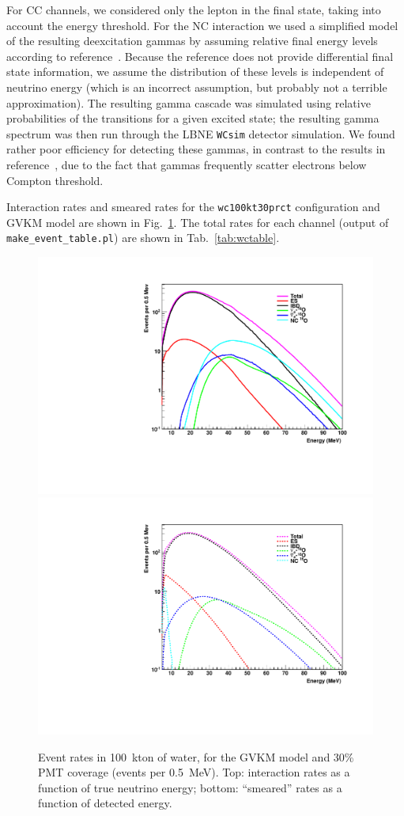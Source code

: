 \documentclass[12pt]{article}
\begin{document}
For CC channels, we considered only the lepton in the final state,
taking into account the energy threshold.  For the NC interaction we
used a simplified model of the resulting deexcitation gammas by
assuming relative final energy levels according to
reference~\cite{Kolbe:2002gk}.  Because the reference does not provide
differential final state information, we assume the distribution of
these levels is independent of neutrino energy (which is an incorrect
assumption, but probably not a terrible approximation).  The resulting
gamma cascade was simulated using relative probabilities of the
transitions for a given excited state; the resulting gamma spectrum
was then run through the LBNE \texttt{WCsim} detector simulation.  We found rather poor
efficiency for detecting these gammas, in contrast to the results in
reference~\cite{Langanke:1995he}, due to the fact that gammas
frequently scatter electrons below Compton threshold.

Interaction rates and smeared rates for the \texttt{wc100kt30prct} configuration and GVKM model are shown in
Fig.~\ref{fig:wcrates}.  The total rates for each channel (output of \texttt{make\_event\_table.pl}) are shown in Tab.~\ref{tab:wctable}.

\begin{figure}[htb]
  \centering\includegraphics[width=.75\textwidth]{figures/interaction_rates_gvkm_wc100kt30prct.pdf}
  \centering\includegraphics[width=.75\textwidth]{figures/smeared_rates_gvkm_wc100kt30prct.pdf}

  \caption{Event rates in 100~kton of water, for the GVKM model and 30\% PMT
    coverage (events per 0.5~MeV). Top: interaction rates as a
    function of true neutrino energy; bottom:  ``smeared''
    rates as a function of detected energy.}
  \label{fig:wcrates}
\end{figure}
\end{document}
